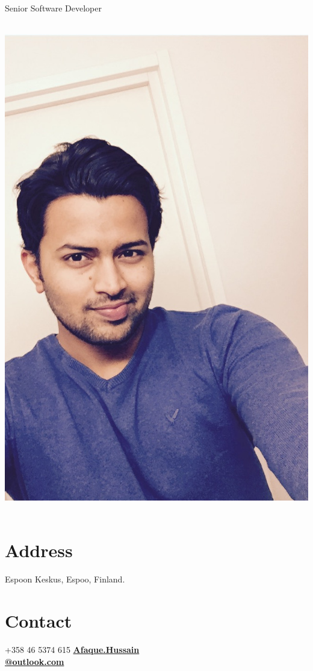 \documentclass[]{friggeri-cv}
\begin{document}
      {Senior Software Developer}
      


\begin{aside}
  ~
  \includegraphics[scale=0.10]{img/me.jpg}
  ~
  \section{Address}
    Espoon Keskus,
    Espoo,
    Finland.
    ~
  \section{Contact}
    +358 46 5374 615
    \href{mailto:Afaque.Hussain@outlook.com}{\textbf{Afaque.Hussain\\@outlook.com}}
    ~

\end{aside}
\end{document}
